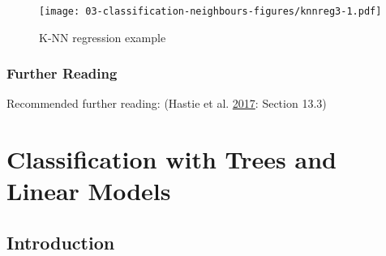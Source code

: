 \documentclass[10pt,b5paper,krantz1]{krantz}
\newenvironment{Shaded}{\begin{snugshade}}{\end{snugshade}}
\newcommand{\DataTypeTok}[1]{\textcolor[rgb]{0.27,0.27,0.27}{#1}}
\newcommand{\DecValTok}[1]{\textcolor[rgb]{0.06,0.06,0.06}{#1}}
\newcommand{\KeywordTok}[1]{\textcolor[rgb]{0.27,0.27,0.27}{\textbf{#1}}}
\newcommand{\NormalTok}[1]{#1}
\newcommand{\StringTok}[1]{\textcolor[rgb]{0.5,0.5,0.5}{#1}}
\begin{document}
\begin{Shaded}
\end{Shaded}

\begin{figure}
\hypertarget{fig:knnreg3}{%
\centering
\texttt{[image: 03-classification-neighbours-figures/knnreg3-1.pdf]}
\caption{K-NN regression example}\label{fig:knnreg3}
}
\end{figure}

\hypertarget{further-reading-2}{%
\subsection{Further Reading}\label{further-reading-2}}

Recommended further reading: (Hastie et al. \protect\hyperlink{ref-esl}{2017}: Section 13.3)

\hypertarget{classification-with-trees-and-linear-models}{%
\chapter{Classification with Trees and Linear Models}\label{classification-with-trees-and-linear-models}}

\hypertarget{introduction-5}{%
\section{Introduction}\label{introduction-5}}
\end{document}
